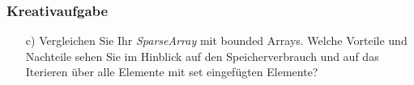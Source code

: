 \begin{frame}
	\frametitle{Kreativaufgabe}

	\begin{itemize}
		\item[c)] Vergleichen Sie Ihr \textit{SparseArray} mit bounded Arrays. Welche Vorteile und Nachteile sehen
			Sie im Hinblick auf den Speicherverbrauch und auf das Iterieren über alle Elemente mit set eingefügten Elemente?
	\end{itemize}

\end{frame}


